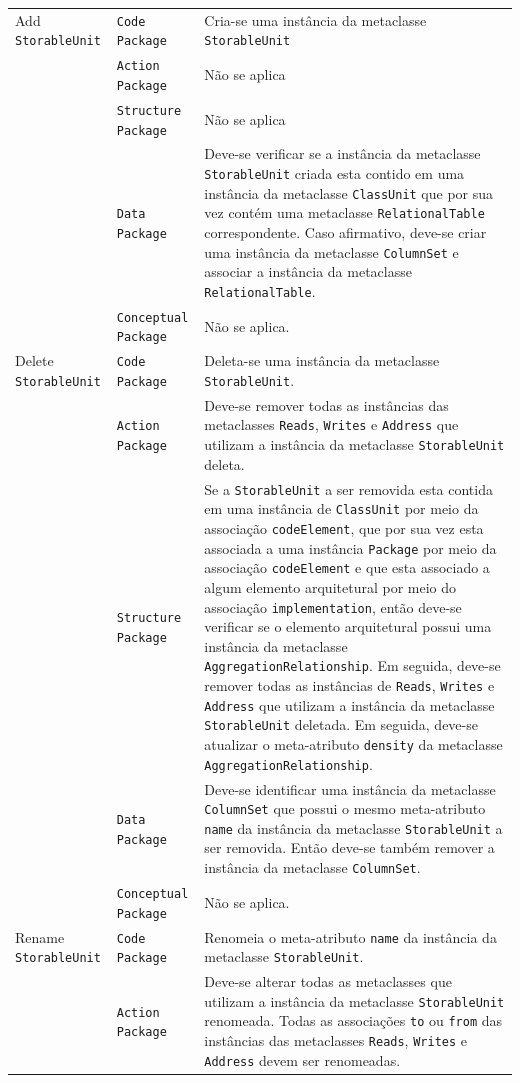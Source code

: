 \begin{longtable}{ | m{1.9cm} | m{3.57cm}| m{9.3cm} | }
 Add \texttt{StorableUnit} & \texttt{Code Package} & Cria-se uma instância da metaclasse \texttt{StorableUnit}\tabularnewline
\cline{2-3} 
\cline{2-3} 
 & \texttt{Action Package} & Não se aplica \tabularnewline
 \cline{2-3} 
 & \texttt{Structure Package} & Não se aplica \tabularnewline
\cline{2-3} 
 & \texttt{Data Package} & Deve-se verificar se a instância da metaclasse \texttt{StorableUnit} criada esta contido em uma instância da metaclasse \texttt{ClassUnit} que por sua vez contém uma metaclasse \texttt{RelationalTable} correspondente. Caso afirmativo, deve-se criar uma instância da metaclasse \texttt{ColumnSet} e associar a instância da metaclasse \texttt{RelationalTable}. \tabularnewline
\cline{2-3} 
 & \texttt{Conceptual Package} & Não se aplica. \tabularnewline
\hline 
 Delete \texttt{StorableUnit} & \texttt{Code Package} & Deleta-se uma instância da metaclasse \texttt{StorableUnit}.\tabularnewline
\cline{2-3} 
& \texttt{Action Package} & Deve-se remover todas as instâncias das metaclasses \texttt{Reads}, \texttt{Writes} e \texttt{Address} que utilizam a instância da metaclasse \texttt{StorableUnit} deleta. \tabularnewline
\cline{2-3}
& \texttt{Structure Package} & Se a \texttt{StorableUnit} a ser removida esta contida em uma instância de \texttt{ClassUnit} por meio da associação \texttt{codeElement}, que por sua vez esta associada a uma instância \texttt{Package} por meio da associação \texttt{codeElement} e que esta associado a algum elemento arquitetural por meio do associação \texttt{implementation}, então deve-se verificar se o elemento arquitetural possui uma instância da metaclasse \texttt{AggregationRelationship}. Em seguida, deve-se remover todas as instâncias de \texttt{Reads}, \texttt{Writes} e \texttt{Address} que utilizam a instância da metaclasse \texttt{StorableUnit} deletada. Em seguida, deve-se atualizar o meta-atributo \texttt{density} da metaclasse \texttt{AggregationRelationship}. \tabularnewline
\cline{2-3}
& \texttt{Data Package} & Deve-se identificar uma instância da metaclasse \texttt{ColumnSet} que possui o mesmo meta-atributo \texttt{name} da instância da metaclasse \texttt{StorableUnit} a ser removida. Então deve-se também remover a instância da metaclasse \texttt{ColumnSet}. \tabularnewline
\cline{2-3}
& \texttt{Conceptual Package} & Não se aplica. \tabularnewline
\hline
Rename \texttt{StorableUnit} & \texttt{Code Package} & Renomeia o meta-atributo \texttt{name} da instância da metaclasse \texttt{StorableUnit}.\tabularnewline
\cline{2-3}
& \texttt{Action Package} & Deve-se alterar todas as metaclasses que utilizam a instância da metaclasse \texttt{StorableUnit} renomeada. Todas as associações \texttt{to} ou \texttt{from} das instâncias das metaclasses \texttt{Reads}, \texttt{Writes} e \texttt{Address} devem ser renomeadas. \tabularnewline

\end{longtable}
